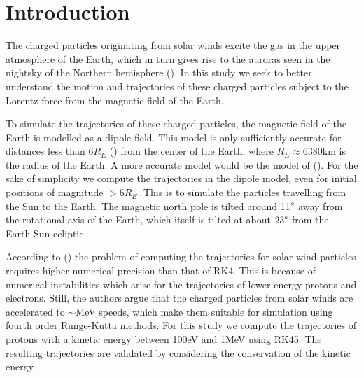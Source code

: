 \section{Introduction}
The charged particles originating from solar winds excite the gas in the upper atmosphere of the Earth, which in turn gives rise to the auroras seen in the nightsky of the Northern hemisphere (\cite{chen_2015}). 
In this study we seek to better understand the motion and trajectories of these charged particles subject to the Lorentz force from the magnetic field of the Earth. 

To simulate the trajectories of these charged particles, the magnetic field of the Earth is modelled  as a dipole field. 
This model is only sufficiently accurate for distances less than $6R_E$ (\cite{soni_2021}) from the center of the Earth, where $R_E \approx 6380$km is the radius of the Earth. 
A more accurate model would be the model of (\cite{hones_1963}).
For the sake of simplicity we compute the trajectories in the dipole model, even for initial positions of magnitude $>6R_E$. 
This is to simulate the particles travelling from the Sun to the Earth.
The magnetic north pole is tilted around 11$\degree$ away from the rotational axis of the Earth, which itself is tilted at about $23\degree$ from the Earth-Sun ecliptic.

According to (\cite{soni_2021}) the problem of computing the trajectories for solar wind particles requires higher numerical precision than that of RK4. 
This is because of numerical instabilities which arise for the trajectories of lower energy protons and electrons. 
Still, the authors argue that the charged particles from solar winds are accelerated to $\sim$MeV speeds, which make them suitable for simulation using fourth order Runge-Kutta methods. 
For this study we compute the trajectories of protons with a kinetic energy between 100eV and 1MeV  using RK45.
The resulting trajectories are validated by considering the conservation of the kinetic energy.